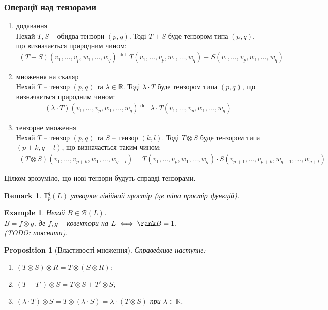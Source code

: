 \documentclass[a4paper, 10pt]{article}
\theoremstyle{theoremdd}
\newtheorem{example}[theorem]{Example}
\newtheorem{proposition}[theorem]{Proposition}
\newtheorem{remark}[theorem]{Remark}
\begin{document}
\subsubsection*{Операції над тензорами}
\begin{enumerate}[nosep,wide=0pt,label={\arabic*)}]
\item додавання\\
Нехай $T,S$ -- обидва тензори $(p,q)$. Тоді $T+S$ буде тензором типа $(p,q)$, що визначається природним чином:
\begin{align*}
(T+S)(v_1,\dots,v_p,w_1,\dots,w_q) \overset{\text{def.}}{=} T(v_1,\dots,v_p,w_1,\dots,w_q) + S(v_1,\dots,v_p,w_1,\dots,w_q)
\end{align*}
\item множення на скаляр\\
Нехай $T$ -- тензор $(p,q)$ та $\lambda \in \mathbb{R}$. Тоді $\lambda \cdot T$ буде тензором типа $(p,q)$, що визначається природним чином:
\begin{align*}
(\lambda \cdot T)(v_1,\dots,v_p,w_1,\dots,w_q) \overset{\text{def.}}{=} \lambda \cdot T(v_1,\dots,v_p,w_1,\dots,w_q)
\end{align*}
\item тензорне множення\\
Нехай $T$ -- тензор $(p,q)$ та $S$ -- тензор $(k,l)$. Тоді $T \otimes S$ буде тензором типа $(p+k,q+l)$, що визначається таким чином:
\begin{align*}
(T \otimes S)(v_1,\dots,v_{p+k},w_1,\dots,w_{q+l}) = T(v_1,\dots,v_p,w_1,\dots,w_q) \cdot S(v_{p+1},\dots,v_{p+k},w_{q+1},\dots,w_{q+l})
\end{align*}
\end{enumerate}
\noindent
Цілком зрозуміло, що нові тензори будуть справді тензорами.\\

\begin{remark}
$\mathbb{T}_p^q(L)$ утворює лінійний простір (це тіпа простір функцій).
\end{remark}

\begin{example}
Нехай $B \in \mathcal{B}(L)$.\\
$B = f \otimes g$, де $f,g$ -- ковектори на $L \iff \rank B = 1$.\\
(TODO: пояснити).
\end{example}

\begin{proposition}[Властивості множення]
Справедливе наступне:
\begin{enumerate}[nosep,wide=0pt,label={\arabic*)}]
\item $(T \otimes S) \otimes R = T \otimes (S \otimes R)$;
\item $(T + T') \otimes S = T \otimes S + T' \otimes S$;
\item $(\lambda \cdot T) \otimes S = T \otimes (\lambda \cdot S) = \lambda \cdot (T \otimes S)$ при $\lambda \in \mathbb{R}$.
\end{enumerate}
\end{proposition}
\end{document}
